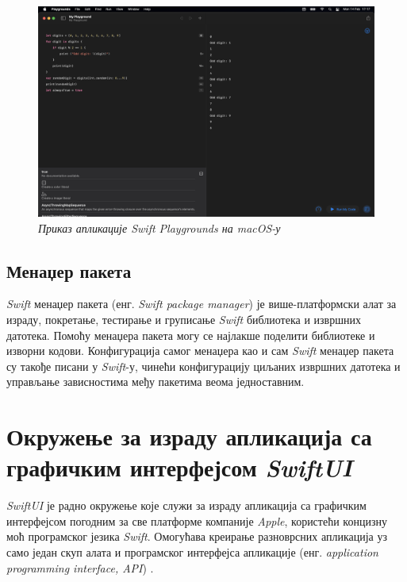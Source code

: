 \documentclass[12pt,oneside]{memoir}
\begin{document}
\begin{figure}[H]
\includegraphics[width=1\textwidth]{images/Swift_Playground_macOS.png}
\centering
\caption{\textit{Приказ апликације Swift Playgrounds на macOS-у}}
\label{slika:swift_playground_macos}
\end{figure}

\subsection{Менаџер пакета}

\indent \textit{Swift} менаџер пакета (енг. \textit{Swift package manager}) је више-платформски алат за израду, покретање, тестирање и груписање \textit{Swift} библиотека и извршних датотека. Помоћу менаџера пакета могу се најлакше поделити библиотеке и изворни кодови. Конфигурација самог менаџера као и сам \textit{Swift} менаџер пакета су такође писани у \textit{Swift}-у, чинећи конфигурацију циљаних извршних датотека и управљање зависностима међу пакетима веома једноставним.

\section{Окружење за израду апликација са графичким интерфејсом \textit{SwiftUI}}
\label{sec:SwiftUI}

\indent \textit{SwiftUI} је радно окружење које служи за израду апликација са графичким интерфејсом погодним за све платформе компаније \textit{Apple}, користећи концизну моћ програмског језика \textit{Swift}. Омогућава креирање разноврсних апликација уз само један скуп алата и програмског интерфејса апликације (енг. \textit{application programming interface, API}) \cite{SwiftUI_Cookbook}.
\end{document}
